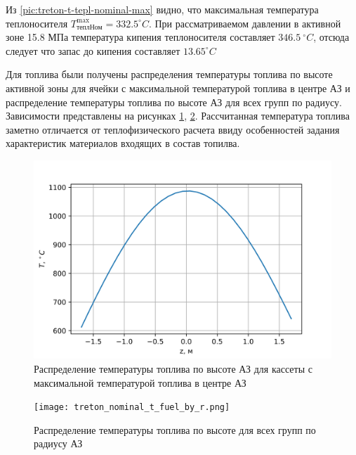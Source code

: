  Из \ref{pic:treton-t-tepl-nominal-max} видно, что максимальная температура теплоносителя $T_{\text{тепл} \text{Ном}}^{\max} = 332.5 ^\circ C$.
 При рассматриваемом давлении в активной зоне 15.8 МПа температура кипения теплоносителя составляет $346.5\ ^\circ C$, отсюда следует что запас до кипения составляет $13.65 ^\circ C$

 Для топлива были получены распределения температуры топлива по высоте активной зоны для ячейки с максимальной температурой топлива в центре АЗ и распределение температуры топлива по высоте АЗ для всех групп по радиусу. Зависимости представлены на рисунках \ref{pic:treton-t-fuel-nominal-max}, \ref{pic:treton-t-fuel-nominal-by-r}. Рассчитанная температура топлива заметно отличается от теплофизического расчета ввиду особенностей задания характеристик материалов входящих в состав топилва.

\begin{figure}[H]
	\begin{center}
		\includegraphics{treton_nominal_t_fuel_max.png}
		\caption{Распределение температуры топлива по высоте АЗ для кассеты с максимальной температурой топлива в центре АЗ}
		\label{pic:treton-t-fuel-nominal-max} %
	\end{center}
\end{figure}

\begin{figure}[H]
	\begin{center}
		\texttt{[image: treton\_nominal\_t\_fuel\_by\_r.png]}
		\caption{Распределение температуры топлива по высоте для всех групп по радиусу АЗ}
		\label{pic:treton-t-fuel-nominal-by-r} %
	\end{center}
\end{figure}

